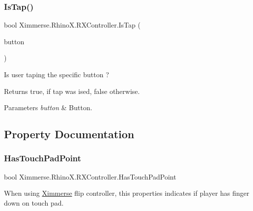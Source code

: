 \subsubsection{\texorpdfstring{Is\+Tap()}{IsTap()}}
{\footnotesize\ttfamily bool Ximmerse.\+Rhino\+X.\+R\+X\+Controller.\+Is\+Tap (\begin{DoxyParamCaption}\item[{\mbox{\hyperlink{namespace_ximmerse_1_1_rhino_x_a99f73f11bba9d4b424daba6c5a5abc0b}{Controller\+Button\+Code}}}]{button }\end{DoxyParamCaption})\hspace{0.3cm}{\ttfamily [inline]}}



Is user taping the specific button ? 

\begin{DoxyReturn}{Returns}
{\ttfamily true}, if tap was ised, {\ttfamily false} otherwise.
\end{DoxyReturn}

\begin{DoxyParams}{Parameters}
{\em button} & Button.\\
\hline
\end{DoxyParams}


\subsection{Property Documentation}
\mbox{\label{class_ximmerse_1_1_rhino_x_1_1_r_x_controller_ac7f62ba234dae32195cd95530a8e2879}} 
\subsubsection{\texorpdfstring{Has\+Touch\+Pad\+Point}{HasTouchPadPoint}}
{\footnotesize\ttfamily bool Ximmerse.\+Rhino\+X.\+R\+X\+Controller.\+Has\+Touch\+Pad\+Point\hspace{0.3cm}{\ttfamily [get]}}



When using \mbox{\hyperlink{namespace_ximmerse}{Ximmerse}} flip controller, this properties indicates if player has finger down on touch pad. 

